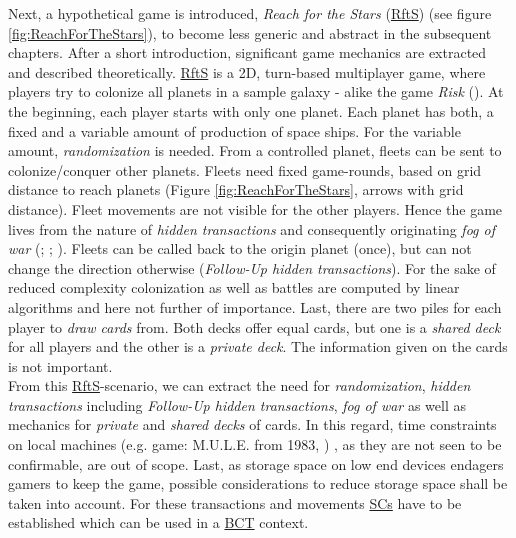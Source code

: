 Next, a hypothetical game is introduced, \textit{Reach for the Stars} (\hyperref[def:RftS]{RftS}) (see figure \ref{fig:ReachForTheStars}), to become less generic and abstract in the subsequent chapters.
\label{def:RftS}
After a short introduction, significant game mechanics are extracted and described theoretically.
\hyperref[def:RftS]{RftS} is a 2D, turn-based multiplayer game, where players try to colonize all planets in a sample galaxy - alike the game \textit{Risk} (\citet{Hasbro.2021}).
At the beginning, each player starts with only one planet.
Each planet has both, a fixed and a variable amount of production of space ships.
For the variable amount, \textit{randomization} is needed.
From a controlled planet, fleets can be sent to colonize/conquer other planets.
Fleets need fixed game-rounds, based on grid distance to reach planets (Figure \ref{fig:ReachForTheStars}, arrows with grid distance).
Fleet movements are not visible for the other players.
Hence the game lives from the nature of \textit{hidden transactions} and consequently originating \textit{fog of war} (\citet{By.2011}; \citet{Hagelback.2008}; \citet{Setear.1989}).
Fleets can be called back to the origin planet (once), but can not change the direction otherwise (\textit{Follow-Up hidden transactions}).
For the sake of reduced complexity colonization as well as battles are computed by linear algorithms and here not further of importance.
Last, there are two piles for each player to \textit{draw cards} from.
Both decks offer equal cards, but one is a \textit{shared deck} for all players and the other is a \textit{private deck}.
The information given on the cards is not important. \\
From this \hyperref[def:RftS]{RftS}-scenario, we can extract the need for \textit{randomization}, \textit{hidden transactions} including \textit{Follow-Up hidden transactions}, \textit{fog of war} as well as mechanics for \textit{private} and \textit{shared decks} of cards.
In this regard, time constraints on local machines
(e.g. game: M.U.L.E. from 1983, \citet{Wikipedia.2021d})
, as they are not seen to be confirmable, are out of scope.
Last, as storage space on low end devices endagers gamers to keep the game,
possible considerations to reduce storage space shall be taken into account.
For these transactions and movements \hyperref[sec:SmartContract]{SCs} have to be established which can be used in a \hyperref[chap:BCT]{BCT} context. \\

\pagebreak

\FloatBarrier


